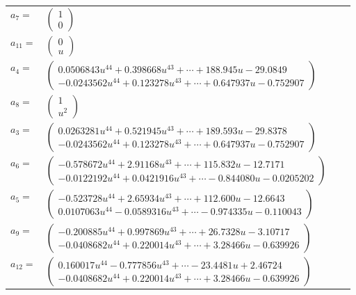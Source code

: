 \documentclass[1p]{elsarticle_modified}
\theoremstyle{definition}
\begin{document}
\begin{tabular}{m{7pt} m{180pt} m{7pt} m{180pt} }
\flushright $a_{7}=$&$\begin{pmatrix}1\\0\end{pmatrix}$ \\
\flushright $a_{11}=$&$\begin{pmatrix}0\\u\end{pmatrix}$ \\
\flushright $a_{4}=$&$\begin{pmatrix}0.0506843 u^{44}+0.398668 u^{43}+\cdots+188.945 u-29.0849\\-0.0243562 u^{44}+0.123278 u^{43}+\cdots+0.647937 u-0.752907\end{pmatrix}$ \\
\flushright $a_{8}=$&$\begin{pmatrix}1\\u^2\end{pmatrix}$ \\
\flushright $a_{3}=$&$\begin{pmatrix}0.0263281 u^{44}+0.521945 u^{43}+\cdots+189.593 u-29.8378\\-0.0243562 u^{44}+0.123278 u^{43}+\cdots+0.647937 u-0.752907\end{pmatrix}$ \\
\flushright $a_{6}=$&$\begin{pmatrix}-0.578672 u^{44}+2.91168 u^{43}+\cdots+115.832 u-12.7171\\-0.0122192 u^{44}+0.0421916 u^{43}+\cdots-0.844080 u-0.0205202\end{pmatrix}$ \\
\flushright $a_{5}=$&$\begin{pmatrix}-0.523728 u^{44}+2.65934 u^{43}+\cdots+112.600 u-12.6643\\0.0107063 u^{44}-0.0589316 u^{43}+\cdots-0.974335 u-0.110043\end{pmatrix}$ \\
\flushright $a_{9}=$&$\begin{pmatrix}-0.200885 u^{44}+0.997869 u^{43}+\cdots+26.7328 u-3.10717\\-0.0408682 u^{44}+0.220014 u^{43}+\cdots+3.28466 u-0.639926\end{pmatrix}$ \\
\flushright $a_{12}=$&$\begin{pmatrix}0.160017 u^{44}-0.777856 u^{43}+\cdots-23.4481 u+2.46724\\-0.0408682 u^{44}+0.220014 u^{43}+\cdots+3.28466 u-0.639926\end{pmatrix}$ \\

\end{tabular}
\end{document}

